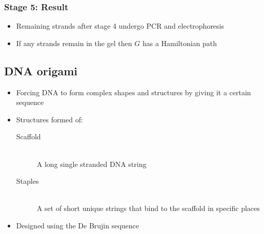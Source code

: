 \documentclass[a4paper]{article}
\begin{document}
\subsubsection{Stage 5: Result}

\begin{itemize}
  \item Remaining strands after stage 4 undergo PCR and electrophoresis
  \item If any strands remain in the gel then $G$ has a Hamiltonian path
\end{itemize}

\subsection{DNA origami}

\begin{itemize}
  \item Forcing DNA to form complex shapes and structures by giving it a certain
        sequence
  \item Structures formed of:
    \begin{description}
      \item[Scaffold] \hfill \\
        A long single stranded DNA string
      \item[Staples] \hfill \\
        A set of short unique strings that bind to the scaffold in specific
        places
    \end{description}
  \item Designed using the De Brujin sequence
\end{itemize}
\end{document}
